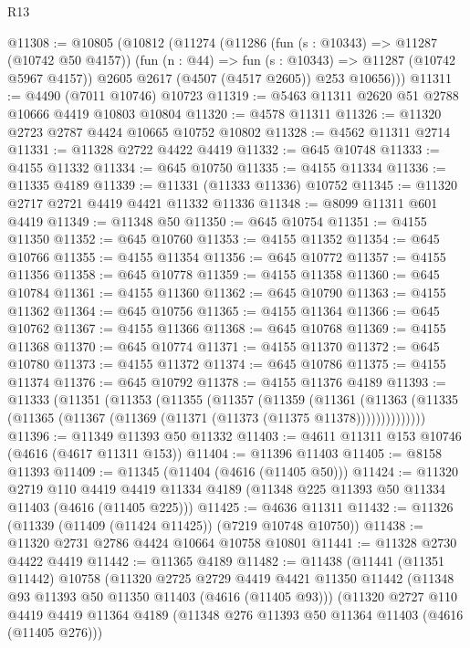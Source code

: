 \begin{lexlean}{R13}
\begin{coremodule}
@11308 := @10805
    (@10812
      (@11274
        (@11286
          (fun (s : @10343) => @11287 (@10742 @50 @4157))
          (fun (n : @44) => fun (s : @10343) => @11287 (@10742 @5967 @4157))
          @2605
          @2617
          (@4507 (@4517 @2605))
          @253
          @10656)))
@11311 := @4490 (@7011 @10746) @10723
@11319 := @5463 @11311 @2620 @51 @2788 @10666 @4419 @10803 @10804
@11320 := @4578 @11311
@11326 := @11320 @2723 @2787 @4424 @10665 @10752 @10802
@11328 := @4562 @11311 @2714
@11331 := @11328 @2722 @4422 @4419
@11332 := @645 @10748
@11333 := @4155 @11332
@11334 := @645 @10750
@11335 := @4155 @11334
@11336 := @11335 @4189
@11339 := @11331 (@11333 @11336) @10752
@11345 := @11320 @2717 @2721 @4419 @4421 @11332 @11336
@11348 := @8099 @11311 @601 @4419
@11349 := @11348 @50
@11350 := @645 @10754
@11351 := @4155 @11350
@11352 := @645 @10760
@11353 := @4155 @11352
@11354 := @645 @10766
@11355 := @4155 @11354
@11356 := @645 @10772
@11357 := @4155 @11356
@11358 := @645 @10778
@11359 := @4155 @11358
@11360 := @645 @10784
@11361 := @4155 @11360
@11362 := @645 @10790
@11363 := @4155 @11362
@11364 := @645 @10756
@11365 := @4155 @11364
@11366 := @645 @10762
@11367 := @4155 @11366
@11368 := @645 @10768
@11369 := @4155 @11368
@11370 := @645 @10774
@11371 := @4155 @11370
@11372 := @645 @10780
@11373 := @4155 @11372
@11374 := @645 @10786
@11375 := @4155 @11374
@11376 := @645 @10792
@11378 := @4155 @11376 @4189
@11393 := @11333
    (@11351
      (@11353
        (@11355
          (@11357
            (@11359
              (@11361
                (@11363 (@11335 (@11365 (@11367 (@11369 (@11371 (@11373 (@11375 @11378))))))))))))))
@11396 := @11349 @11393 @50 @11332
@11403 := @4611 @11311 @153 @10746 (@4616 (@4617 @11311 @153))
@11404 := @11396 @11403
@11405 := @8158 @11393
@11409 := @11345 (@11404 (@4616 (@11405 @50)))
@11424 := @11320
    @2719
    @110
    @4419
    @4419
    @11334
    @4189
    (@11348 @225 @11393 @50 @11334 @11403 (@4616 (@11405 @225)))
@11425 := @4636 @11311
@11432 := @11326 (@11339 (@11409 (@11424 @11425)) (@7219 @10748 @10750))
@11438 := @11320 @2731 @2786 @4424 @10664 @10758 @10801
@11441 := @11328 @2730 @4422 @4419
@11442 := @11365 @4189
@11482 := @11438
    (@11441
      (@11351 @11442)
      @10758
      (@11320
        @2725
        @2729
        @4419
        @4421
        @11350
        @11442
        (@11348 @93 @11393 @50 @11350 @11403 (@4616 (@11405 @93)))
        (@11320
          @2727
          @110
          @4419
          @4419
          @11364
          @4189
          (@11348 @276 @11393 @50 @11364 @11403 (@4616 (@11405 @276)))

\end{coremodule}
\end{lexlean}
